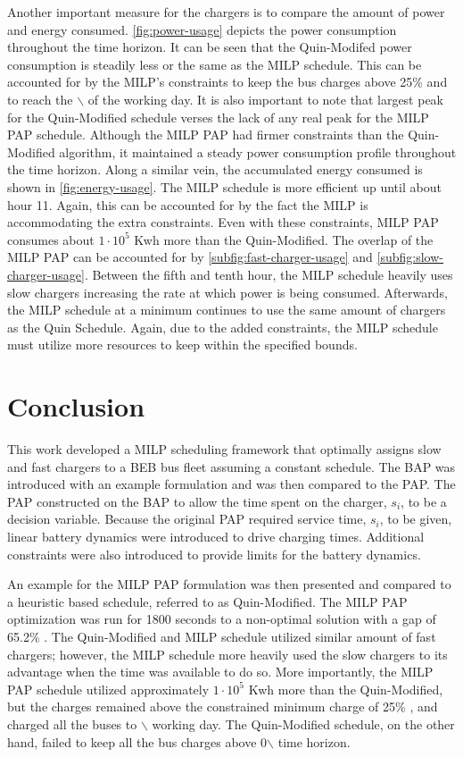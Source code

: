 \documentclass[utf8]{FrontiersinHarvard}
\newcommand{\bcharge}{0.7 }                                                     %
\newcommand{\mincharge}{25\% }                                                  %
\newcommand{\timeran}{1800 }                                                    %
\newcommand{\gappercent}{65.2\% }                                               %
\begin{document}
Another important measure for the chargers is to compare the amount of power and energy consumed.
\autoref{fig:power-usage} depicts the power consumption throughout the time horizon. It can be seen that the
Quin-Modifed power consumption is steadily less or the same as the MILP schedule. This can be accounted for by the
MILP's constraints to keep the bus charges above \mincharge and to reach the \fpeval{\bcharge *100}$\backslash$%
of the working day. It is also important to note that largest peak for the Quin-Modified schedule verses the lack of any
real peak for the MILP PAP schedule. Although the MILP PAP had firmer constraints than the Quin-Modified algorithm, it
maintained a steady power consumption profile throughout the time horizon. Along a similar vein, the accumulated energy
consumed is shown in \autoref{fig:energy-usage}. The MILP schedule is more efficient up until about hour 11. Again, this
can be accounted for by the fact the MILP is accommodating the extra constraints. Even with these constraints, MILP PAP
consumes about \(1\cdot10^5\) Kwh more than the Quin-Modified. The overlap of the MILP PAP can be accounted for by
\autoref{subfig:fast-charger-usage} and \autoref{subfig:slow-charger-usage}. Between the fifth and tenth hour, the MILP
schedule heavily uses slow chargers increasing the rate at which power is being consumed. Afterwards, the MILP schedule
at a minimum continues to use the same amount of chargers as the Quin Schedule. Again, due to the added constraints, the
MILP schedule must utilize more resources to keep within the specified bounds.
\section{Conclusion}
\label{sec:conclusion}
This work developed a MILP scheduling framework that optimally assigns slow and fast chargers to a BEB bus fleet
assuming a constant schedule. The BAP was introduced with an example formulation and was then compared to the PAP. The
PAP constructed on the BAP to allow the time spent on the charger, \(s_i\), to be a decision variable. Because the
original PAP required service time, \(s_i\), to be given, linear battery dynamics were introduced to drive charging times.
Additional constraints were also introduced to provide limits for the battery dynamics.

An example for the MILP PAP formulation was then presented and compared to a heuristic based schedule, referred to as
Quin-Modified. The MILP PAP optimization was run for \timeran seconds to a non-optimal solution with a gap of
\gappercent. The Quin-Modified and MILP schedule utilized similar amount of fast chargers; however, the MILP schedule
more heavily used the slow chargers to its advantage when the time was available to do so. More importantly, the MILP
PAP schedule utilized approximately \(1\cdot10^5\) Kwh more than the Quin-Modified, but the charges remained above the
constrained minimum charge of \mincharge, and charged all the buses to \fpeval{\bcharge *100}$\backslash$%
working day. The Quin-Modified schedule, on the other hand, failed to keep all the bus charges above 0$\backslash$%
time horizon.
\end{document}
